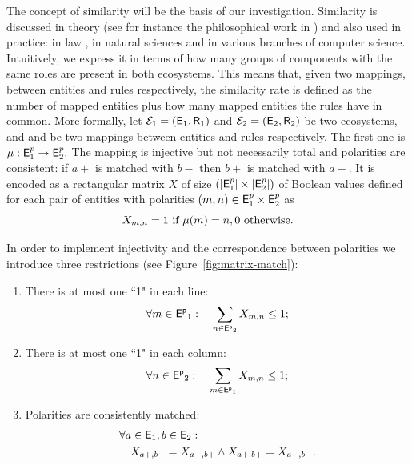 \documentclass[a4paper,twoside]{article}
\begin{document}
The concept of similarity will be the basis of our investigation.
Similarity  is discussed in theory (see for instance the philosophical work in \cite{tversky}) and also used in practice: in law \cite{Mooiman}, in natural sciences \cite{bbw090} and in 
various branches of computer science. 
Intuitively, we express it in terms of how many  groups of components with the same roles are present in both ecosystems.
This means that, given two mappings, between entities and rules respectively, 
the similarity rate is defined as the number of mapped entities plus how many mapped entities the rules have in common. 
More formally, let $\mathcal{E}_1 = (\mathsf{E}_1, \mathsf{R}_1)$ and $\mathcal{E}_2 =
(\mathsf{E}_2, \mathsf{R}_2)$ be two ecosystems, and \mapcomp and \maprule be two mappings between entities and rules respectively.
The first one is $\mu : \mathsf{E}^p_1 \to \mathsf{E}^p_2.$
The mapping \mapcomp is injective but not necessarily total and polarities are consistent: \ie if $a+$ is matched with $b-$ then $b+$ is matched with $a-$. It is encoded as a rectangular matrix $X$  of size $(|\mathsf{E}^p_1| \times |\mathsf{E}^p_2|)$ of Boolean values defined for each pair of entities with polarities $(m,n) \in \mathsf{E}^p_1 \times \mathsf{E}^p_2$ as
$$X_{m,n} = 1 \text{ if } \mu(m)=n, 0 \text{ otherwise.} $$

In order to implement  injectivity and the correspondence between polarities we introduce three restrictions (see Figure~\ref{fig:matrix-match}): 
\begin{enumerate}
\item There is at most one ``1" in  each line:~ 
$$
\forall m \in \mathsf{E^p}_1: \quad
   \sum_{n \in \mathsf{E^p}_2} X_{m,n}  \leq 1;
  $$
  
 \item There is at most one ``1" in  each column:~  
$$
\forall n \in \mathsf{E^p}_2: \quad
   \sum_{m \in \mathsf{E^p}_1} X_{m,n}  \leq 1;
  $$
 \item Polarities are consistently matched: 
\begin{align*}
 &\forall a \in \mathsf{E}_1, b \in \mathsf{E}_2: \\
  & \quad X_{a+,b-} = X_{a-,b+} \land X_{a+,b+} = X_{a-,b-} .
\end{align*}
\end{enumerate}
\end{document}
